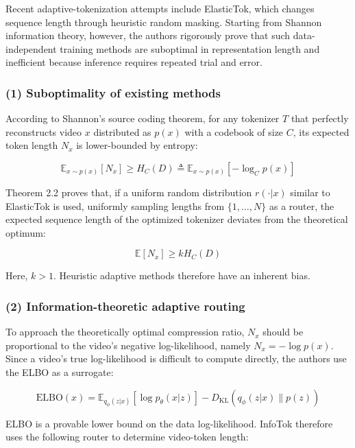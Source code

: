 Recent adaptive-tokenization attempts include ElasticTok, which changes sequence length through heuristic random masking. Starting from Shannon information theory, however, the authors rigorously prove that such data-independent training methods are suboptimal in representation length and inefficient because inference requires repeated trial and error.

\hypertarget{suboptimality-of-existing-methods}{%
\subsubsection{(1) Suboptimality of existing methods}\label{suboptimality-of-existing-methods}}

According to Shannon's source coding theorem, for any tokenizer \(T\) that perfectly reconstructs video \(x\) distributed as \(p(x)\) with a codebook of size \(C\), its expected token length \(N_x\) is lower-bounded by entropy:

\[
\mathbb{E}_{x\sim p(x)}[N_x]\ge H_C(D)
\triangleq
\mathbb{E}_{x\sim p(x)}[-\log_C p(x)]
\]

Theorem 2.2 proves that, if a uniform random distribution \(r(\cdot|x)\) similar to ElasticTok is used, uniformly sampling lengths from \(\{1,\ldots,N\}\) as a router, the expected sequence length of the optimized tokenizer deviates from the theoretical optimum:

\[
\mathbb{E}[N_x]\ge kH_C(D)
\]

Here, \(k\gt 1\). Heuristic adaptive methods therefore have an inherent bias.

\hypertarget{information-theoretic-adaptive-routing}{%
\subsubsection{(2) Information-theoretic adaptive routing}\label{information-theoretic-adaptive-routing}}

To approach the theoretically optimal compression ratio, \(N_x\) should be proportional to the video's negative log-likelihood, namely \(N_x=-\log p(x)\). Since a video's true log-likelihood is difficult to compute directly, the authors use the ELBO as a surrogate:

\[
\mathrm{ELBO}(x) =
\mathbb{E}_{q_\phi(z|x)}[\log p_\theta(x|z)] -
D_{\mathrm{KL}}(q_\phi(z|x)\|p(z))
\]

ELBO is a provable lower bound on the data log-likelihood. InfoTok therefore uses the following router to determine video-token length:

